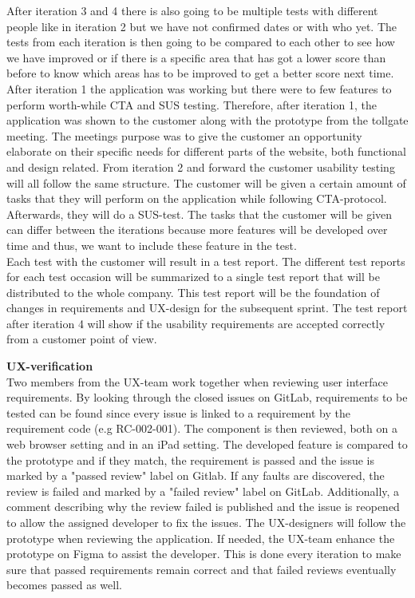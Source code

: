 \noindent After iteration 3 and 4 there is also going to be multiple tests with different people like in iteration 2 but we have not confirmed dates or with who yet. The tests from each iteration is then going to be compared to each other to see how we have improved or if there is a specific area that has got a lower score than before to know which areas has to be improved to get a better score next time. After iteration 1 the application was working but there were to few features to perform worth-while CTA and SUS testing. Therefore, after iteration 1, the application was shown to the customer along with the prototype from the tollgate meeting. The meetings purpose was to give the customer an opportunity elaborate on their specific needs for different parts of the website, both functional and design related. From iteration 2 and forward the customer usability testing will all follow the same structure. The customer will be given a certain amount of tasks that they will perform on the application while following CTA-protocol. Afterwards, they will do a SUS-test. The tasks that the customer will be given can differ between the iterations because more features will be developed over time and thus, we want to include these feature in the test. \\

\noindent Each test with the customer will result in a test report. The different test reports for each test occasion will be summarized to a single test report that will be distributed to the whole company. This test report will be the foundation of changes in requirements and UX-design for the subsequent sprint. The test report after iteration 4 will show if the usability requirements are accepted correctly from a customer point of view.\newline

\noindent \textbf{UX-verification}\\
Two members from the UX-team work together when reviewing user interface requirements. By looking through the closed issues on GitLab, requirements to be tested can be found since every issue is linked to a requirement by the requirement code (e.g RC-002-001). The component is then reviewed, both on a web browser setting and in an iPad setting. The developed feature is compared to the prototype and if they match, the requirement is passed and the issue is marked by a "passed review" label on Gitlab. If any faults are discovered, the review is failed and marked by a "failed review" label on GitLab. Additionally, a comment describing why the review failed is published and the issue is reopened to allow the assigned developer to fix the issues. The UX-designers will follow the prototype when reviewing the application. If needed, the UX-team enhance the prototype on Figma to assist the developer. This is done every iteration to make sure that passed requirements remain correct and that failed reviews eventually becomes passed as well. \\ 

